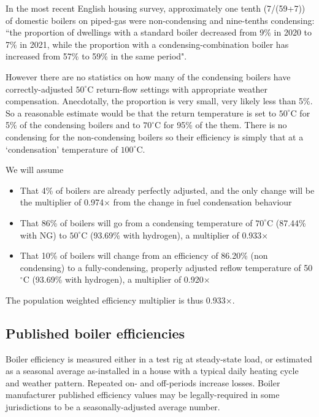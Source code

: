 \documentclass[5p]{elsarticle} %
\begin{document}
In the most recent English housing survey\citep{ehs21}, approximately one tenth (7/(59+7)) of domestic boilers on piped-gas were non-condensing and nine-tenths condensing: 
``the proportion of dwellings with a standard boiler decreased from 9\% in 2020 to 7\% in 2021, while the proportion with a condensing-combination boiler has increased from 57\% to 59\% in the same period".

However there are no statistics on how many of the condensing boilers have correctly-adjusted $50^\circ$C return-flow settings with appropriate weather compensation. Anecdotally, the proportion is very small, very likely less than 5\%. So a reasonable estimate would be that the return temperature is set to $50^\circ$C for 5\% of the condensing boilers and to $70^\circ$C for 95\% of the them. There is no condensing for the non-condensing boilers so their efficiency is simply that at  a `condensation' temperature of $100^\circ$C.

We will assume
\begin{itemize}

    \item That 4\% of boilers are already perfectly adjusted, and the only change will be the multiplier of 0.974$\times$ from the change in fuel condensation behaviour
    \item That 86\% of boilers will go from a condensing temperature of $70^\circ$C (87.44\% with NG) to $50^\circ$C (93.69\% with hydrogen), a multiplier of  0.933$\times$
    
    \item That 10\% of boilers will change from an efficiency of  86.20\% (non condensing) to a fully-condensing, properly adjusted reflow temperature of 50$^\circ$C (93.69\% with hydrogen), a multiplier of 0.920$\times$
\end{itemize}
The population weighted efficiency multiplier is thus 0.933$\times$.

\subsection{Published boiler efficiencies}
Boiler efficiency\citep{Bennet2017} is  measured either in a test rig at steady-state load, or estimated as a seasonal average as-installed in a house with a typical daily heating cycle and weather pattern. Repeated on- and off-periods increase losses\citep{saty2018}. Boiler manufacturer published efficiency values may be legally-required in some jurisdictions to be a seasonally-adjusted average number.
\end{document}
